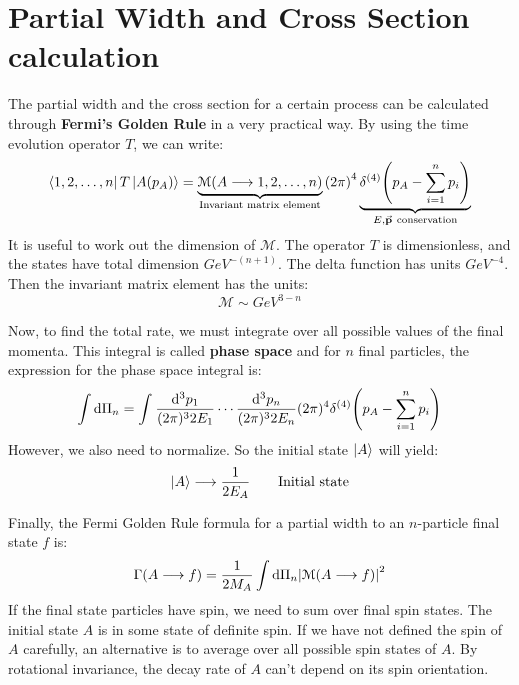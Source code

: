 \documentclass[../../main/main.tex]{subfiles}
\begin{document}
\section{Partial Width and Cross Section calculation}
The partial width and the cross section for a certain process can be calculated through \textbf{Fermi's Golden Rule} in a very practical way. By using the time evolution operator \( T \), we can write:
\begin{equation}
    \bra{1,2,\dots,n} T \ket{A(p_A)}
    =
    \underbrace{\mathcal{M}(A \longrightarrow 1,2,\dots,n)}_{\text{Invariant matrix element}} \qty(2\pi)^4 \underbrace{\delta^{(4)} \qty(p_A - \sum_{i=1}^{n} p_i )}_{E, \va{p} \ \text{conservation}}
    \label{eq:L03_TEO}
\end{equation}
It is useful to work out the dimension of \( \mathcal{M} \). The operator \( T \) is dimensionless, and the states have total dimension \( \si{GeV^{-(n+1)}} \). The delta function has units \( \si{GeV^{-4}} \). Then the invariant matrix element has the units:
\begin{equation}
	\mathcal{M} \sim \si{GeV^{3-n}}
	\label{eq:L03_MED}
\end{equation}

Now, to find the total rate, we must integrate over all possible values of the final momenta. This integral is called \textbf{phase space} and for \( n \) final particles, the expression for the phase space integral is:
\begin{equation}
    \int \mathrm{d}{\Pi_{n}}
    =
    \int_{}^{} \frac{\mathrm{d}{^3 p_1}}{(2\pi)^3 2 E_1} \cdots \frac{\mathrm{d}{^3 p_n}}{(2\pi)^3 2 E_n} (2\pi)^4 \delta^{(4)} \qty(p_A - \sum_{i=1}^{n} p_i )
    \label{eq:L03_PSI}
\end{equation}
However, we also need to normalize. So the initial state \( \ket{A} \) will yield:
\begin{equation}
    \ket{A} \longrightarrow \frac{1}{2 E_A} \qquad \text{Initial state}
    \label{eq:L03_ISN}
\end{equation}

Finally, the Fermi Golden Rule formula for a partial width to an \( n \)-particle final state \( f \) is:
\begin{equation}
    \Gamma(A \longrightarrow f)
    =
    \frac{1}{2 M_A} \int \mathrm{d}{\Pi_n} \abs{\mathcal{M}(A \longrightarrow f)}^2
    \label{eq:L03_FGR}
\end{equation}
If the final state particles have spin, we need to sum over final spin states. The initial state \( A \) is in some state of definite spin. If we have not defined the spin of \( A \) carefully, an alternative is to average over all possible spin states of \( A \). By rotational invariance, the decay rate of \( A \) can't depend on its spin orientation.
\end{document}
